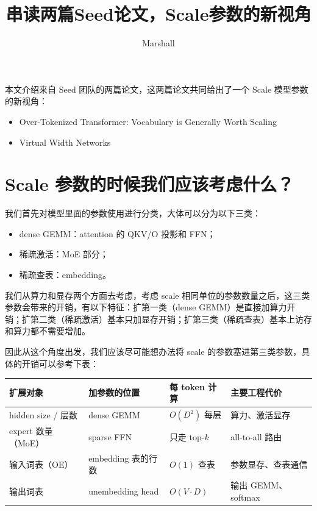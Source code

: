 \documentclass[11pt]{article}
\title{串读两篇Seed论文，Scale参数的新视角}
\author{Marshall}
\begin{document}
\maketitle

本文介绍来自 Seed 团队的两篇论文，这两篇论文共同给出了一个 Scale 模型参数的新视角：

\begin{itemize}
  \item Over-Tokenized Transformer: Vocabulary is Generally Worth Scaling
  \item Virtual Width Networks
\end{itemize}

\section{Scale 参数的时候我们应该考虑什么？}

我们首先对模型里面的参数使用进行分类，大体可以分为以下三类：

\begin{itemize}
  \item dense GEMM：attention 的 QKV/O 投影和 FFN；
  \item 稀疏激活：MoE 部分；
  \item 稀疏查表：embedding。
\end{itemize}

我们从算力和显存两个方面去考虑，考虑 scale 相同单位的参数数量之后，这三类参数会带来的开销，有以下特征：扩第一类（dense GEMM）是直接加算力开销；扩第二类（稀疏激活）基本只加显存开销；扩第三类（稀疏查表）基本上访存和算力都不需要增加。

因此从这个角度出发，我们应该尽可能想办法将 scale 的参数塞进第三类参数，具体的开销可以参考下表：

\begin{table}[htbp]
  \centering
  \small
  \begin{tabular}{p{3.0cm}p{3.4cm}p{3.9cm}p{4.6cm}}
    \hline
    \textbf{扩展对象} & \textbf{加参数的位置} & \textbf{每 token 计算} & \textbf{主要工程代价} \\
    \hline
    hidden size / 层数 & dense GEMM & $O(D^2)$ 每层 & 算力、激活显存 \\
    \hline
    expert 数量（MoE） & sparse FFN & 只走 top-$k$ & all-to-all 路由 \\
    \hline
    输入词表（OE） & embedding 表的行数 & $O(1)$ 查表 & 参数显存、查表通信 \\
    \hline
    输出词表 & unembedding head & $O(V \cdot D)$ & 输出 GEMM、softmax \\
    \hline
  \end{tabular}
\end{table}
\end{document}
